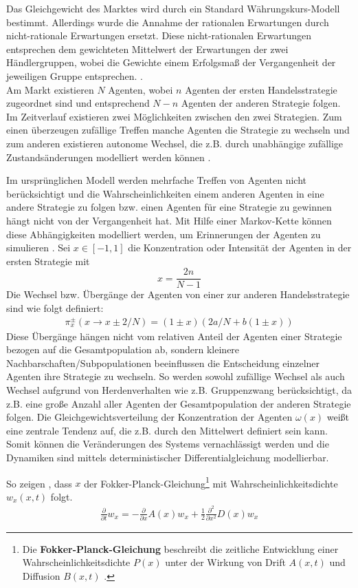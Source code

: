 \documentclass[ngerman]{ttlab-qualify}
\begin{document}
Das Gleichgewicht des Marktes wird durch ein Standard Währungskurs-Modell bestimmt. Allerdings wurde die Annahme der rationalen Erwartungen durch nicht-rationale Erwartungen ersetzt. Diese nicht-rationalen Erwartungen entsprechen dem gewichteten Mittelwert der Erwartungen der zwei Händlergruppen, wobei die Gewichte einem Erfolgsmaß der Vergangenheit der jeweiligen Gruppe entsprechen. \parencite{AL:2008}.\\

Am Markt existieren $N$ Agenten, wobei $n$ Agenten der ersten Handelsstrategie zugeordnet sind und entsprechend $N-n$ Agenten der anderen Strategie folgen. Im Zeitverlauf existieren zwei Möglichkeiten zwischen den zwei Strategien. Zum einen  überzeugen zufällige Treffen manche Agenten die Strategie zu wechseln und zum anderen existieren autonome Wechsel, die z.B. durch unabhängige zufällige Zustandsänderungen modelliert werden können \parencite{AL:2008}. 

Im ursprünglichen Modell werden mehrfache Treffen von Agenten nicht berücksichtigt und die Wahrscheinlichkeiten einem anderen Agenten in eine andere Strategie zu folgen bzw. einen Agenten für eine Strategie zu gewinnen hängt nicht von der Vergangenheit hat. Mit Hilfe einer Markov-Kette können diese Abhängigkeiten modelliert werden, um Erinnerungen der Agenten zu simulieren \parencite{AL:2008}. 
Sei $x\in [-1,1]$ die Konzentration oder Intensität der Agenten in der ersten Strategie mit
\[ x=\frac{2n}{N-1} \]
Die Wechsel bzw. Übergänge der Agenten von einer zur anderen Handelsstrategie sind wie folgt definiert:
\begin{align}
\pi_x^{\pm} (x \rightarrow x \pm 2/N) = (1\pm x)(2a/N + b(1\pm x)) 
\end{align}
Diese Übergänge hängen nicht vom relativen Anteil der Agenten einer Strategie bezogen auf die Gesamtpopulation ab, sondern kleinere Nachbarschaften/Subpopulationen beeinflussen die Entscheidung einzelner Agenten ihre Strategie zu wechseln. So werden sowohl zufällige Wechsel als auch Wechsel aufgrund von Herdenverhalten wie z.B. Gruppenzwang berücksichtigt, da z.B. eine große Anzahl aller Agenten der Gesamtpopulation der anderen Strategie folgen.
Die Gleichgewichtsverteilung der Konzentration der Agenten $\omega(x)$ weißt eine zentrale Tendenz auf, die z.B. durch den Mittelwert definiert sein kann.
Somit können die Veränderungen des Systems vernachlässigt werden und die Dynamiken sind mittels deterministischer Differentialgleichung modellierbar.

So zeigen \parencite{AL:2008}, dass $x$ der Fokker-Planck-Gleichung\footnote{Die \textbf{Fokker-Planck-Gleichung} beschreibt die zeitliche Entwicklung einer Wahrscheinlichkeitsdichte $P(x)$ unter der Wirkung von Drift $A(x,t)$ und Diffusion $B(x,t)$ \parencite{FokkerPlanck}.} mit Wahrscheinlichkeitsdichte $w_x(x,t)$ folgt. 
\begin{align}
\label{eq:AL-FP}
\frac{\partial}{\partial t}w_x = -\frac{\partial}{\partial x} A(x)w_x +\frac{1}{2}\frac{\partial^2}{\partial x^2} D(x)w_x 
\end{align}
\end{document}
